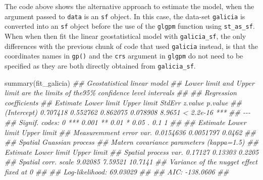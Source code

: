 \documentclass[
  letterpaper,
]{krantz}
\newenvironment{Shaded}{\begin{snugshade}}{\end{snugshade}}
\newcommand{\DocumentationTok}[1]{\textcolor[rgb]{0.37,0.37,0.37}{\textit{#1}}}
\newcommand{\FunctionTok}[1]{\textcolor[rgb]{0.28,0.35,0.67}{#1}}
\newcommand{\NormalTok}[1]{\textcolor[rgb]{0.00,0.23,0.31}{#1}}
\begin{document}
The code above shows the alternative approach to estimate the model,
when the argument passed to \texttt{data} is an \texttt{sf} object. In
this case, the data-set \texttt{galicia} is converted into an
\texttt{sf} object before the use of the \texttt{glgpm} function using
\texttt{st\_as\_sf}. When when then fit the linear geostatistical model
with \texttt{galicia\_sf}, the only differences with the previous chunk
of code that used \texttt{galicia} instead, is that the coordinates
names in \texttt{gp()} and the \texttt{crs} argument in \texttt{glgpm}
do not need to be specified as they are both directly obtained from
\texttt{galicia\_sf}.

\begin{Shaded}
\begin{Highlighting}[]
\FunctionTok{summary}\NormalTok{(fit\_galicia)}
\DocumentationTok{\#\# Geostatistical linear model }
\DocumentationTok{\#\# \textquotesingle{}Lower limit\textquotesingle{} and \textquotesingle{}Upper limit\textquotesingle{} are the limits of the95\% confidence level intervals }
\DocumentationTok{\#\# }
\DocumentationTok{\#\#  Regression coefficients }
\DocumentationTok{\#\#             Estimate Lower limit Upper limit   StdErr z.value   p.value    }
\DocumentationTok{\#\# (Intercept) 0.707418    0.552762    0.862075 0.078908  8.9651 \textless{} 2.2e{-}16 ***}
\DocumentationTok{\#\# {-}{-}{-}}
\DocumentationTok{\#\# Signif. codes:  0 \textquotesingle{}***\textquotesingle{} 0.001 \textquotesingle{}**\textquotesingle{} 0.01 \textquotesingle{}*\textquotesingle{} 0.05 \textquotesingle{}.\textquotesingle{} 0.1 \textquotesingle{} \textquotesingle{} 1}
\DocumentationTok{\#\# }
\DocumentationTok{\#\#                           Estimate Lower limit Upper limit}
\DocumentationTok{\#\# Measuremment error var. 0.0154636   0.0051797      0.0462}
\DocumentationTok{\#\# }
\DocumentationTok{\#\#  Spatial Guassian process }
\DocumentationTok{\#\# Matern covariance parameters (kappa=1.5) }
\DocumentationTok{\#\#                      Estimate Lower limit Upper limit}
\DocumentationTok{\#\# Spatial process var.  0.17127     0.13303      0.2205}
\DocumentationTok{\#\# Spatial corr. scale   9.02085     7.59521     10.7141}
\DocumentationTok{\#\# Variance of the nugget effect fixed at 0 }
\DocumentationTok{\#\# }
\DocumentationTok{\#\#  Log{-}likelihood: 69.03029}
\DocumentationTok{\#\# }
\DocumentationTok{\#\#  AIC: {-}138.0606}
\DocumentationTok{\#\# }
\end{Highlighting}
\end{Shaded}
\end{document}
